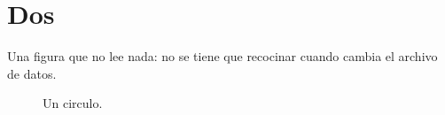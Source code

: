 \section{Dos}

Una figura que no lee nada: no se tiene que recocinar cuando cambia el archivo de datos.

\begin{figure}[ht]
  \centering
  \caption{Un circulo.}
\end{figure}
